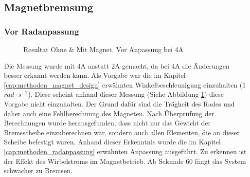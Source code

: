 \subsection{Magnetbremsung}\label{cap:ergebnisse_magnetbremsung}
\subsubsection{Vor Radanpassung}
\begin{figure}[ht]
  \begin{center}
  \end{center}
  \vspace{-3ex}
  \caption{Resultat Ohne \& Mit Magnet, Vor Anpassung bei 4A}
  \label{fig:plot_or_results}
\end{figure}
Die Messung wurde mit 4A anstatt 2A gemacht, da bei 4A die Änderungen besser erkannt werden kann.
\newpara
Als Vorgabe war die im Kapitel \ref{cap:methoden_magnet_design} erwähnten Winkelbeschleunigung einzuhalten (1 $rad\cdot s^{-2}$). Diese scheint anhand dieser Messung (Siehe Abbildung \ref{fig:plot_or_results}) diese Vorgabe nicht einzuhalten. Der Grund dafür sind die Trägheit des Rades und daher auch eine Fehlberechnung des Magneten. Nach Überprüfung der Berechnungen wurde herausgefunden, dass nicht nur das Gewicht der Bremsscheibe einzuberechnen war, sondern auch allen Elementen, die an dieser Scheibe befestigt waren. Anhand dieser Erkenntnis wurde die im Kapitel \ref{cap:methoden_radanpassung} erwähnten Anpassung ausgeführt.
\newpara
Zu erkennen ist der Effekt des Wirbelstroms im Magnetbetrieb. Ab Sekunde 60 fängt das System schwächer zu Bremsen.

